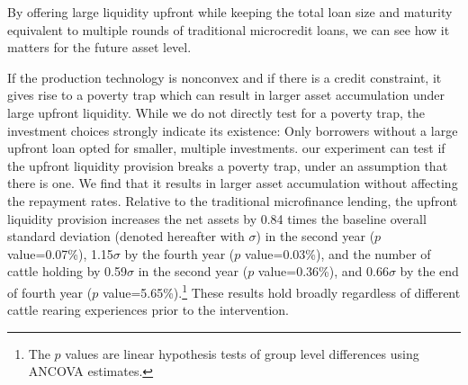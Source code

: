 	By offering large liquidity upfront while keeping the total loan size and maturity equivalent to multiple rounds of traditional microcredit loans, we can see how it matters for the future asset level. 

	If the production technology is nonconvex and if there is a credit constraint, it gives rise to a poverty trap which can result in larger asset accumulation under large upfront liquidity. While we do not directly test for a poverty trap, the investment choices strongly indicate its existence: Only borrowers without a large upfront loan opted for smaller, multiple investments.  our experiment can test if the upfront liquidity provision breaks a poverty trap, under an assumption that there is one. We find that it results in larger asset accumulation without affecting the repayment rates. Relative to the traditional microfinance lending, the upfront liquidity provision increases the net assets by 
	0.84 times the baseline overall standard deviation (denoted hereafter with $\sigma$) in the second year ($p$ value=0.07\%), 
	1.15$\sigma$ by the fourth year ($p$ value=0.03\%), 
	and the number of cattle holding by 0.59$\sigma$ in the second year ($p$ value=0.36\%), and 
	0.66$\sigma$ by the end of fourth year ($p$ value=5.65\%).\footnote{The $p$ values are linear hypothesis tests of group level differences using ANCOVA estimates. } These results hold broadly regardless of different cattle rearing experiences prior to the intervention. 


